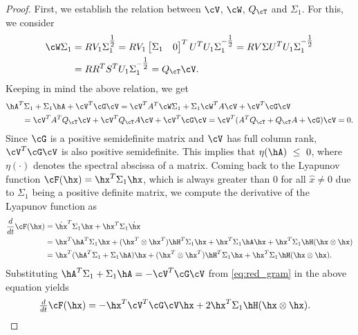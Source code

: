 \begin{proof}
First, we establish the relation between $\cV$, $\cW$, $Q_\cT$ and $\Sigma_1$. For this, we consider
\begin{align*}
\cW\Sigma_1 &= R V_1 \Sigma_1^{\tfrac{1}{2}} = R V_1\bbm \Sigma_1 & 0 \ebm^T U^T U_1 \Sigma_1^{-\tfrac{1}{2}}= R V\Sigma U^T U_1 \Sigma_1^{-\tfrac{1}{2}}\\
& = R R^TS^T U_1 \Sigma_1^{-\tfrac{1}{2}} = Q_\cT\cV.
\end{align*}
Keeping in mind  the above relation, we get
\begin{equation}\label{eq:red_gram}
\begin{aligned}
&\hA^T \Sigma_1 + \Sigma_1 \hA + \cV ^T\cG\cV  = \cV^T A^T \cW\Sigma_1 + \Sigma_1 \cW^T A \cV + \cV^T\cG \cV \\
&\qquad = \cV^T A^T Q_\cT \cV +\cV^T Q_\cT A \cV + \cV^T \cG \cV  = \cV^T(A^TQ_\cT + Q_\cT A + \cG)\cV = 0.
\end{aligned}
\end{equation}
Since $\cG$ is a positive  semidefinite matrix and $\cV$ has full column rank,  $\cV^T\cG\cV$ is also positive semidefinite. This implies that $\eta(\hA)~\leq~0$, where $\eta(\cdot)$ denotes the spectral abscissa of a matrix. Coming back to the Lyapunov function $\cF(\hx) = \hx^T\Sigma_1 \hx$, which is always greater than $0$  for all $\hat{x}\not=0$ due to $\Sigma_1$ being a positive definite matrix, we compute the derivative of the Lyapunov function as
 \begin{equation*}
 \begin{aligned}
  \dfrac{d}{dt}\cF(\hx) &= \dot{\hx}^T\Sigma_1\hx + \hx^T\Sigma_1\dot{\hx} \\
  &= \hx^T \hA^T \Sigma_1 \hx +  (\hx^T\otimes \hx^T)\hH^T \Sigma_1\hx + \hx^T \Sigma_1\hA\hx + \hx^T \Sigma_1 \hH (\hx\otimes \hx)\\
  &= \hx^T(\hA^T\Sigma_1 + \Sigma_1\hA) \hx +  (\hx^T\otimes \hx^T)\hH^T \Sigma_1\hx  + \hx^T \Sigma_1 \hH (\hx\otimes \hx).
 \end{aligned}
 \end{equation*}
 Substituting $\hA^T\Sigma_1 + \Sigma_1\hA = - \cV^T\cG\cV$ from \eqref{eq:red_gram} in the above equation yields
 \begin{align}\label{eq:2}
  \tfrac{d}{dt}\cF(\hx) &=  -\hx^T\cV^T\cG\cV \hx +  2\hx^T \Sigma_1 \hH (\hx\otimes \hx).

\end{align}
\end{proof}
